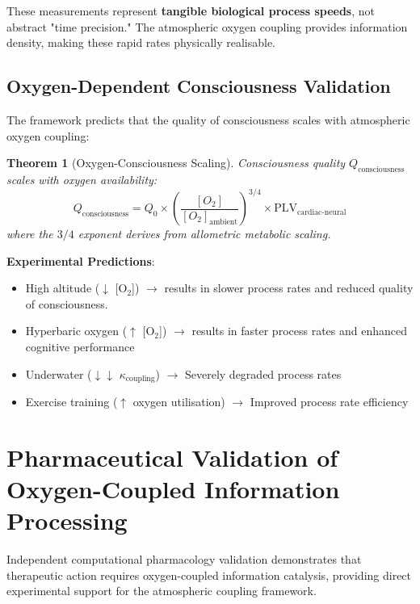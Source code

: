 \documentclass[12pt]{article}
\newtheorem{theorem}{Theorem}[section]
\theoremstyle{remark}
\begin{document}
These measurements represent \textbf{tangible biological process speeds}, not abstract "time precision." The atmospheric oxygen coupling provides information density, making these rapid rates physically realisable.

\subsection{Oxygen-Dependent Consciousness Validation}

The framework predicts that the quality of consciousness scales with atmospheric oxygen coupling:

\begin{theorem}[Oxygen-Consciousness Scaling]
Consciousness quality $Q_{\text{consciousness}}$ scales with oxygen availability:
\begin{equation}
Q_{\text{consciousness}} = Q_0 \times \left(\frac{[O_2]}{[O_2]_{\text{ambient}}}\right)^{3/4} \times \text{PLV}_{\text{cardiac-neural}}
\end{equation}
where the $3/4$ exponent derives from allometric metabolic scaling.
\end{theorem}

\textbf{Experimental Predictions}:
\begin{itemize}
\item High altitude ($\downarrow$ [O$_2$]) $\rightarrow$ results in slower process rates and reduced quality of consciousness.
\item Hyperbaric oxygen ($\uparrow$ [O$_2$]) $\rightarrow$ results in faster process rates and enhanced cognitive performance
\item Underwater ($\downarrow\downarrow$ $\kappa_{\text{coupling}}$) $\rightarrow$ Severely degraded process rates
\item Exercise training ($\uparrow$ oxygen utilisation) $\rightarrow$ Improved process rate efficiency
\end{itemize}

\section{Pharmaceutical Validation of Oxygen-Coupled Information Processing}

Independent computational pharmacology validation \cite{computational-pharmacology-2024} demonstrates that therapeutic action requires oxygen-coupled information catalysis, providing direct experimental support for the atmospheric coupling framework.
\end{document}
